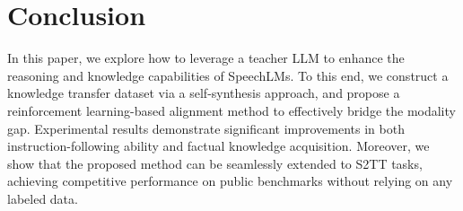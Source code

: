 \documentclass[letterpaper]{article} %
\begin{document}
\section{Conclusion}
In this paper, we explore how to leverage a teacher LLM to enhance the reasoning and knowledge capabilities of SpeechLMs. To this end, we construct a knowledge transfer dataset via a self-synthesis approach, and propose a reinforcement learning-based alignment method to effectively bridge the modality gap. Experimental results demonstrate significant improvements in both instruction-following ability and factual knowledge acquisition. Moreover, we show that the proposed method can be seamlessly extended to S2TT tasks, achieving competitive performance on public benchmarks without relying on any labeled data.





\bigskip
\newpage


\end{document}
